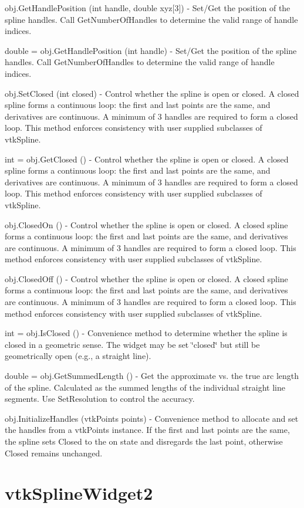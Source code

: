 \begin{DoxyItemize}
\item {\ttfamily obj.\-Get\-Handle\-Position (int handle, double xyz\mbox{[}3\mbox{]})} -\/ Set/\-Get the position of the spline handles. Call Get\-Number\-Of\-Handles to determine the valid range of handle indices.  
\item {\ttfamily double = obj.\-Get\-Handle\-Position (int handle)} -\/ Set/\-Get the position of the spline handles. Call Get\-Number\-Of\-Handles to determine the valid range of handle indices.  
\item {\ttfamily obj.\-Set\-Closed (int closed)} -\/ Control whether the spline is open or closed. A closed spline forms a continuous loop\-: the first and last points are the same, and derivatives are continuous. A minimum of 3 handles are required to form a closed loop. This method enforces consistency with user supplied subclasses of vtk\-Spline.  
\item {\ttfamily int = obj.\-Get\-Closed ()} -\/ Control whether the spline is open or closed. A closed spline forms a continuous loop\-: the first and last points are the same, and derivatives are continuous. A minimum of 3 handles are required to form a closed loop. This method enforces consistency with user supplied subclasses of vtk\-Spline.  
\item {\ttfamily obj.\-Closed\-On ()} -\/ Control whether the spline is open or closed. A closed spline forms a continuous loop\-: the first and last points are the same, and derivatives are continuous. A minimum of 3 handles are required to form a closed loop. This method enforces consistency with user supplied subclasses of vtk\-Spline.  
\item {\ttfamily obj.\-Closed\-Off ()} -\/ Control whether the spline is open or closed. A closed spline forms a continuous loop\-: the first and last points are the same, and derivatives are continuous. A minimum of 3 handles are required to form a closed loop. This method enforces consistency with user supplied subclasses of vtk\-Spline.  
\item {\ttfamily int = obj.\-Is\-Closed ()} -\/ Convenience method to determine whether the spline is closed in a geometric sense. The widget may be set \char`\"{}closed\char`\"{} but still be geometrically open (e.\-g., a straight line).  
\item {\ttfamily double = obj.\-Get\-Summed\-Length ()} -\/ Get the approximate vs. the true arc length of the spline. Calculated as the summed lengths of the individual straight line segments. Use Set\-Resolution to control the accuracy.  
\item {\ttfamily obj.\-Initialize\-Handles (vtk\-Points points)} -\/ Convenience method to allocate and set the handles from a vtk\-Points instance. If the first and last points are the same, the spline sets Closed to the on state and disregards the last point, otherwise Closed remains unchanged.  
\end{DoxyItemize}\hypertarget{vtkwidgets_vtksplinewidget2}{}\section{vtk\-Spline\-Widget2}\label{vtkwidgets_vtksplinewidget2}
